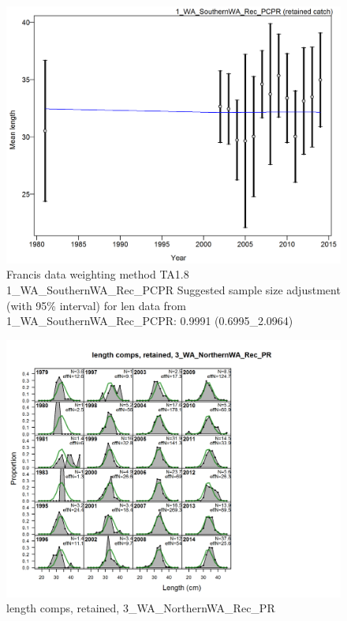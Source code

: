 \documentclass[12pt,]{article}
\begin{document}
\begin{figure}[htbp]
\centering
\includegraphics{./r4ss/plots_mod1/comp_lenfit_data_weighting_TA1.8_1_WA_SouthernWA_Rec_PCPR.png}
\caption{Francis data weighting method TA1.8
1\_WA\_SouthernWA\_Rec\_PCPR Suggested sample size adjustment (with 95\%
interval) for len data from 1\_WA\_SouthernWA\_Rec\_PCPR: 0.9991
(0.6995\_2.0964)
\label{fig:mod1_4_comp_lenfit_data_weighting_TA1.8_1_WA_SouthernWA_Rec_PCPR}}
\end{figure}

\begin{figure}[htbp]
\centering
\includegraphics{./r4ss/plots_mod1/comp_lenfit_flt3mkt2.png}
\caption{length comps, retained, 3\_WA\_NorthernWA\_Rec\_PR
\label{fig:mod1_5_comp_lenfit_flt3mkt2}}
\end{figure}
\end{document}
